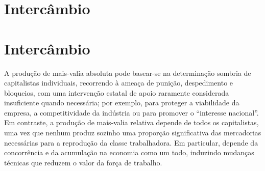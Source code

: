 \section{Intercâmbio}
 \par 
\section{Intercâmbio}
 \par 
A produção de mais-valia absoluta pode basear-se na determinação sombria de capitalistas individuais, recorrendo à ameaça de punição, despedimento e bloqueios, com uma intervenção estatal de apoio raramente considerada insuficiente quando necessária; por exemplo, para proteger a viabilidade da empresa, a competitividade da indústria ou para promover o “interesse nacional”. Em contraste, a produção de mais-valia relativa depende de todos os capitalistas, uma vez que nenhum produz sozinho uma proporção significativa das mercadorias necessárias para a reprodução da classe trabalhadora. Em particular, depende da concorrência e da acumulação na economia como um todo, induzindo mudanças técnicas que reduzem o valor da força de trabalho.
 \par 
